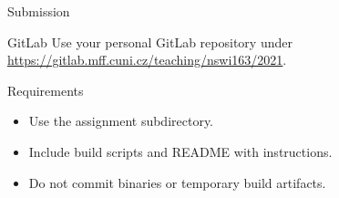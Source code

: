 \begin{frame}{Submission}
    \begin{block}{GitLab}
        Use your personal GitLab repository under \\
        \url{https://gitlab.mff.cuni.cz/teaching/nswi163/2021}.
    \end{block}
    \begin{block}{Requirements}
        \begin{itemize}
            \item Use the assignment subdirectory.
            \item Include build scripts and README with instructions.
            \item Do not commit binaries or temporary build artifacts.
        \end{itemize}
    \end{block}
\end{frame}



